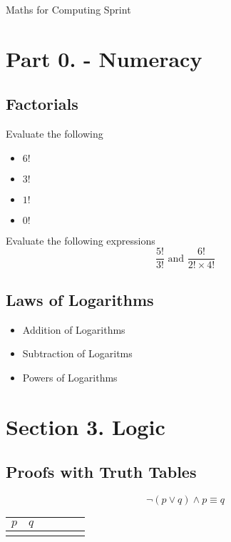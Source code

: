 \documentclass[]{report}
\begin{document}



Maths for Computing Sprint

\section*{Part 0. - Numeracy}
\subsection{Factorials}
Evaluate the following
\begin{itemize}
	\item $6!$
	\item $3!$
	\item $1!$
	\item $0!$
\end{itemize}
Evaluate the following expressions
\[  \frac{5!}{3!}  \mbox{   and   } \frac{6!}{2!\times 4!}  \]
\subsection*{Laws of Logarithms}
\begin{itemize}
	\item Addition of Logarithms
	\item Subtraction of Logaritms
	\item Powers of Logarithms
\end{itemize}


\section*{Section 3. Logic}

\subsection*{Proofs with Truth Tables}

\[ \neg(p \vee q) \wedge p \equiv q \]
\begin{center}
	\begin{tabular}{|c|c||c|c||c|c|}
		\hline $p$ & $q$ &  &  &  &  \\ 
		\hline  &  &  &  &  &  \\ 
		\hline 
	\end{tabular} 
\end{center}
\end{document}
